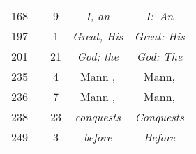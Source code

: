 \documentclass[a4paper,11pt]{article}
\begin{document}
\begin{center}
\begin{tabular}{|c|c|c|c|c|}
    168 & &  9 & \textit{I, an} & \textit{I:~An} \\
    197 & &  1 & \textit{Great, His} & \textit{Great: His} \\
    201 & & 21 & \textit{God; the} & \textit{God: The} \\
    235 & &  4 & Mann , & Mann, \\
    236 & &  7 & Mann , & Mann, \\
    238 & & 23 & \textit{conquests} & \textit{Conquests} \\
    249 & &  3 & \textit{before} & \textit{Before} \\
    \hline
  \end{tabular}











\end{center}
\end{document}
